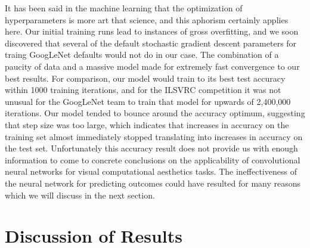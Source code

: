 \documentclass[midd]{thesis}
\begin{document}
It has been said in the machine learning that the optimization of hyperparameters is more art that science, and this aphorism certainly applies here. Our initial training runs lead to instances of gross overfitting, and we soon discovered that several of the default stochastic gradient descent parameters for traing GoogLeNet defaults would not do in our case. The combination of a paucity of data and a massive model made for extremely fast convergence to our best results. For comparison, our model would train to its best test accuracy within 1000 training iterations, and for the ILSVRC competition it was not unusual for the GoogLeNet team to train that model for upwards of 2,400,000 iterations. Our model tended to bounce around the accuracy optimum, suggesting that step size was too large, which indicates that increases in accuracy on the training set almost immediately stopped translating into increases in accuracy on the test set. Unfortunately this accuracy result does not provide us with enough information to come to concrete conclusions on the applicability of convolutional neural networks for visual computational aesthetics tasks. The ineffectiveness of the neural network for predicting outcomes could have resulted for many reasons which we will discuss in the next section.
































\chapter{Discussion of Results}
\end{document}
